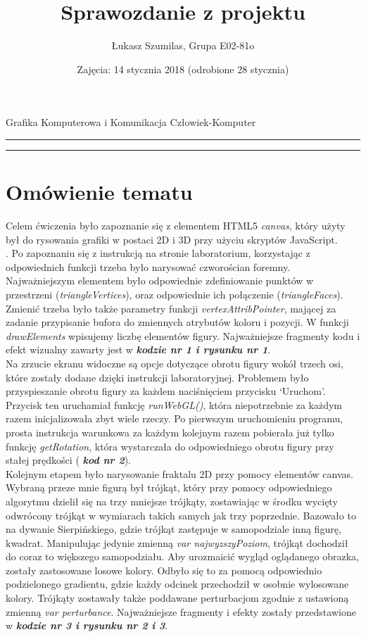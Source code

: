 \documentclass[polish,polish,a4paper]{article}
\title{Sprawozdanie z projektu}
\author{Łukasz Szumilas, Grupa E02-81o}
\date{Zajęcia: 14 stycznia 2018 (odrobione 28 stycznia)}
\begin{document}
  \begin{center}\Large
    Grafika Komputerowa i Komunikacja Człowiek-Komputer
  \end{center}
  \hrule
  {\let\newpage\relax\maketitle}
  \hrule


  \section{Omówienie tematu}
  Celem ćwiczenia było zapoznanie się z elementem HTML5 \textit{canvas}, który użyty był do rysowania grafiki w postaci 2D i 3D przy użyciu skryptów JavaScript.
\\\indent. Po zapoznaniu się z instrukcją na stronie laboratorium, korzystając z odpowiednich funkcji trzeba było narysować czworościan foremny. Najważniejszym elementem było odpowiednie zdefiniowanie punktów w przestrzeni (\textit{triangleVertices}), oraz odpowiednie ich połączenie (\textit{triangleFaces}). Zmienić trzeba było także parametry funkcji \textit{vertexAttribPointer}, mającej za zadanie przypisanie bufora do zmiennych atrybutów koloru i pozycji. W funkcji \textit{drawElements} wpisujemy liczbę elementów figury. Najważniejsze fragmenty kodu i efekt wizualny zawarty jest w \textbf{\textit{kodzie nr 1 i rysunku nr 1}}. 
\\\indent Na zrzucie ekranu widoczne są opcje dotyczące obrotu figury wokół trzech osi, które zostały dodane dzięki instrukcji laboratoryjnej. Problemem było przyspieszanie obrotu figury za każdem naciśnięciem przycisku `Uruchom'. Przycisk ten uruchamiał funkcję \textit{runWebGL()}, która niepotrzebnie za każdym razem inicjalizowała zbyt wiele rzeczy. Po pierwszym uruchomieniu programu, prosta instrukcja warunkowa za każdym kolejnym razem pobierała już tylko funkcję \textit{getRotation}, która wystarczała do odpowiedniego obrotu figury przy stałej prędkości ( \textbf{\textit{kod nr 2}}).
\\\indent Kolejnym etapem było narysowanie fraktalu 2D przy pomocy elementów canvas. Wybraną przeze mnie figurą był trójkąt, który przy pomocy odpowiedniego algorytmu dzielił się na trzy mniejsze trójkąty, zostawiając w środku wycięty odwrócony trójkąt w wymiarach takich samych jak trzy poprzednie. Bazowało to na dywanie Sierpińskiego, gdzie trójkąt zastępuje w samopodziale inną figurę, kwadrat. Manipulując jedynie zmienną \textit{var najwyzszyPoziom}, trójkąt dochodził do coraz to większego samopodziału. Aby urozmaicić wygląd oglądanego obrazka, zostały zastosowane losowe kolory. Odbyło się to za pomocą odpowiednio podzielonego gradientu, gdzie każdy odcinek przechodził w osobnie wylosowane kolory. Trójkąty zostawały także poddawane perturbacjom zgodnie z ustawioną zmienną \textit{var perturbance}. Najważniejsze fragmenty i efekty zostały przedstawione w \textbf{\textit{kodzie nr 3 i rysunku nr 2 i 3}}.
\end{document}
